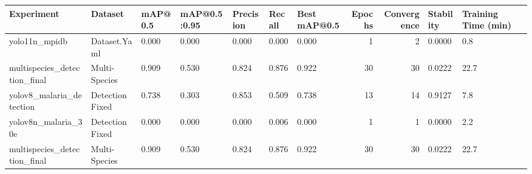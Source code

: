 \begin{tabular}{lllllllrrll}
\toprule
                  Experiment &         Dataset & mAP@0.5 & mAP@0.5:0.95 & Precision & Recall & Best mAP@0.5 &  Epochs &  Convergence & Stability & Training Time (min) \\
\midrule
               yolo11n\_mpidb &    Dataset.Yaml &   0.000 &        0.000 &     0.000 &  0.000 &        0.000 &       1 &            2 &    0.0000 &                 0.8 \\
multispecies\_detection\_final &   Multi-Species &   0.909 &        0.530 &     0.824 &  0.876 &        0.922 &      30 &           30 &    0.0222 &                22.7 \\
    yolov8\_malaria\_detection & Detection Fixed &   0.738 &        0.303 &     0.853 &  0.509 &        0.738 &      13 &           14 &    0.9127 &                 7.8 \\
         yolov8n\_malaria\_30e & Detection Fixed &   0.000 &        0.000 &     0.000 &  0.006 &        0.000 &       1 &            1 &    0.0000 &                 2.2 \\
multispecies\_detection\_final &   Multi-Species &   0.909 &        0.530 &     0.824 &  0.876 &        0.922 &      30 &           30 &    0.0222 &                22.7 \\
\bottomrule
\end{tabular}
